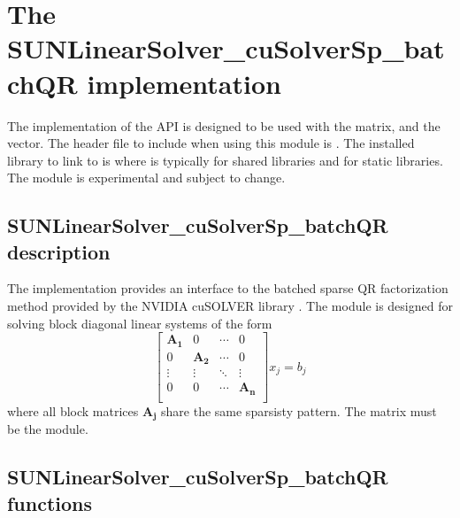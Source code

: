 \section{The SUNLinearSolver\_cuSolverSp\_batchQR implementation}\label{ss:sunlinsol_cuspbqr}

The  implementation of the {\sunlinsol} API is
designed to be used with the  matrix, and the {\nveccuda} vector.
The header file to include when using this module is .
The installed library to link to is 
where  is typically  for shared libraries and  for static libraries.
\newline
\newline
{\warn}The  module is experimental and subject to change.

\subsection{SUNLinearSolver\_cuSolverSp\_batchQR description}\label{ss:sunlinsol_cuspbqr_description}

The  implementation provides an interface to
the batched sparse QR factorization method provided by the NVIDIA cuSOLVER library
\cite{cuSOLVER_site}. The module is designed for solving block diagonal linear systems
of the form
\begin{equation*}
  \begin{bmatrix}
    \mathbf{A_1} & 0 & \cdots & 0\\
    0 & \mathbf{A_2} & \cdots & 0\\
    \vdots & \vdots & \ddots & \vdots\\
    0 & 0 & \cdots & \mathbf{A_n}\\
  \end{bmatrix}
  x_j
  =
  b_j
\end{equation*}
where all block matrices $\mathbf{A_j}$ share the same sparsisty pattern. The matrix
must be the  module.


\subsection{SUNLinearSolver\_cuSolverSp\_batchQR functions}\label{ss:sunlinsol_cuspbqr_functions}

